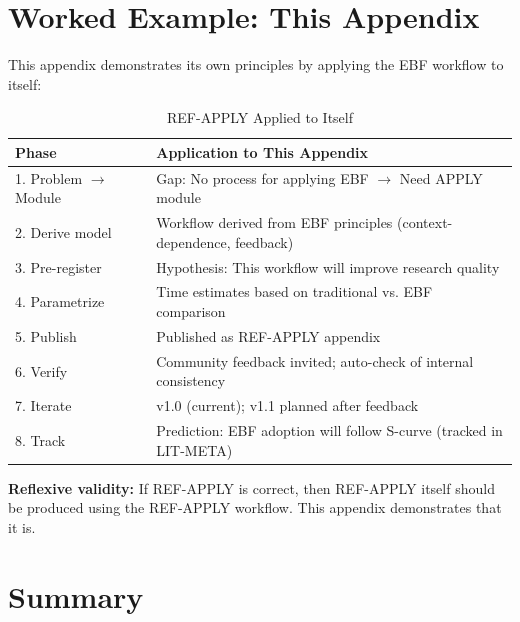 
\section{Worked Example: This Appendix}
\label{sec:apply-example}

This appendix demonstrates its own principles by applying the EBF workflow
to itself:

\begin{table}[htbp]
\centering
\caption{REF-APPLY Applied to Itself}
\label{tab:self-application}
\renewcommand{\arraystretch}{1.3}
\small
\begin{tabular}{@{}lp{8cm}@{}}
\toprule
\textbf{Phase} & \textbf{Application to This Appendix} \\
\midrule
1. Problem $\to$ Module & Gap: No process for applying EBF $\to$ Need APPLY module \\
2. Derive model & Workflow derived from EBF principles (context-dependence, feedback) \\
3. Pre-register & Hypothesis: This workflow will improve research quality \\
4. Parametrize & Time estimates based on traditional vs. EBF comparison \\
5. Publish & Published as REF-APPLY appendix \\
6. Verify & Community feedback invited; auto-check of internal consistency \\
7. Iterate & v1.0 (current); v1.1 planned after feedback \\
8. Track & Prediction: EBF adoption will follow S-curve (tracked in LIT-META) \\
\bottomrule
\end{tabular}
\end{table}

\textbf{Reflexive validity:} If REF-APPLY is correct, then REF-APPLY itself
should be produced using the REF-APPLY workflow. This appendix demonstrates
that it is.



\section{Summary}
\label{sec:apply-summary}

